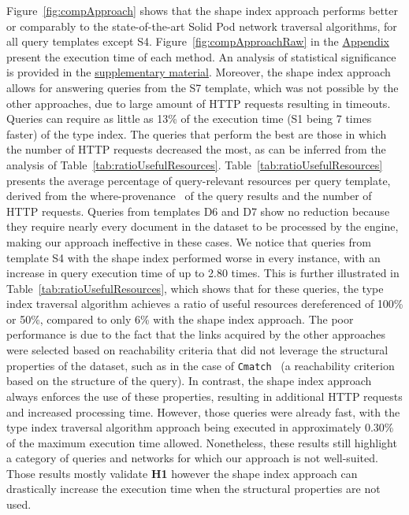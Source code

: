 Figure~\ref{fig:compApproach} shows that the shape index approach performs better or comparably to the state-of-the-art Solid Pod network traversal algorithms, for all query templates except S4.
Figure~\ref{fig:compApproachRaw} in the \hyperref[sec:appendix]{Appendix} present the execution time of each method.
An analysis of statistical significance is provided in the \hyperref[sec:supplementalMaterial]{supplementary material}.
Moreover, the shape index approach allows for answering queries from the S7 template, which was not possible by the other approaches, due to large amount of HTTP requests resulting in timeouts.
Queries can require as little as 13\% of the execution time (S1 being 7 times faster) of the type index.
The queries that perform the best are those in which the number of HTTP requests decreased the most, as can be inferred from the analysis of Table~\ref{tab:ratioUsefulResources}.
Table~\ref{tab:ratioUsefulResources} presents the average percentage of query-relevant resources per query template, derived from the where-provenance~\cite{buneman2001and} of the query results and the number of HTTP requests. 
Queries from templates D6 and D7 show no reduction because they require nearly every document in the dataset to be processed by the engine, making our approach ineffective in these cases.
We notice that queries from template S4 with the shape index performed worse in every instance, with an increase in query execution time of up to 2.80 times.
This is further illustrated in Table~\ref{tab:ratioUsefulResources}, which shows that for these queries, the type index traversal algorithm achieves a ratio of useful resources dereferenced of 100\% or 50\%, compared to only 6\% with the shape index approach.
The poor performance is due to the fact that the links acquired by the other approaches were selected based on reachability criteria that did not leverage the structural properties of the dataset, such as in the case of \texttt{Cmatch}~\cite{hartig2016walking} (a reachability criterion based on the structure of the query).
In contrast, the shape index approach always enforces the use of these properties, resulting in additional HTTP requests and increased processing time.
However, those queries were already fast, with the type index traversal algorithm approach being executed in approximately 0.30\% of the maximum execution time allowed.
Nonetheless, these results still highlight a category of queries and networks for which our approach is not well-suited.
Those results mostly validate \textbf{H1} however the shape index approach can drastically increase the execution time when the structural properties are not used.

